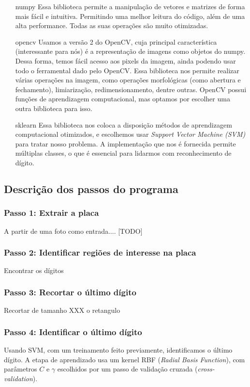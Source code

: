 \documentclass{lista}
\begin{document}
\begin{itemize}
	\item[numpy] Essa biblioteca permite a manipulação de vetores e matrizes
		de forma mais fácil e intuitiva. Permitindo uma melhor leitura do
		código, além de uma alta performance. Todas as suas operações são
		muito otimizadas.

	\item[opencv] Usamos a versão 2 do OpenCV, cuja principal característica
		(interessante para nós) é a representação de imagens como objetos
		do numpy. Dessa forma, temos fácil acesso aos pixels da imagem, ainda
		podendo usar todo o ferramental dado pelo OpenCV. Essa biblioteca nos
		permite realizar várias operações na imagem, como operações
		morfológicas (como abertura e fechamento), limiarização,
		redimensionamento, dentre outras. OpenCV possui funções de
		aprendizagem computacional, mas optamos por escolher uma outra
		biblioteca para isso.

	\item[sklearn] Essa biblioteca nos coloca a disposição métodos de
		aprendizagem computacional otimizados, e escolhemos usar 
		\textit{Support Vector Machine (SVM)} para tratar nosso problema.
		A implementação que nos é fornecida permite múltiplas classes, o que
		é essencial para lidarmos com reconhecimento de dígito.
\end{itemize}

\subsection{Descrição dos passos do programa}

\subsubsection*{Passo 1: Extrair a placa}
A partir de uma foto como entrada.... [TODO]

\subsubsection*{Passo 2: Identificar regiões de interesse na placa}
Encontrar os dígitos

\subsubsection*{Passo 3: Recortar o último dígito}
Recortar de tamanho XXX o retangulo

\subsubsection*{Passo 4: Identificar o último dígito}
Usando SVM, com um treinamento feito previamente, identificamos o último
dígito.
A etapa de aprendizado usa um kernel RBF (\textit{Radial Basis Function}),
com parâmetros $C$ e $\gamma$ escolhidos por um passo de validação
cruzada (\textit{cross-validation}).
\end{document}
